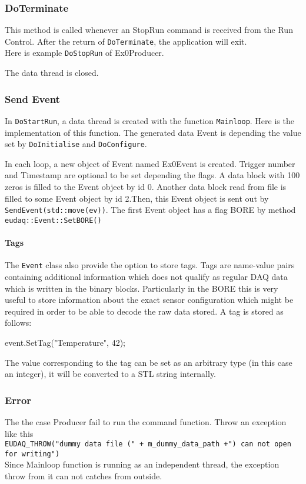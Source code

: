 \subsubsection{DoTerminate}
This method is called whenever an StopRun command is received from the Run Control. After the return of \lstinline[style=cpp]{DoTerminate}, the application will exit.\\
Here is example \lstinline[style=cpp]{DoStopRun} of Ex0Producer.

The data thread is closed. 

\subsubsection{Send Event}
In \lstinline[style=cpp]{DoStartRun}, a data thread is created with the function \lstinline[style=cpp]{Mainloop}. Here is the implementation of this function. The generated data Event is depending the value set by \lstinline[style=cpp]{DoInitialise} and \lstinline[style=cpp]{DoConfigure}.

In each loop, a new object of Event named Ex0Event is created. Trigger number and Timestamp are optional to be set depending the flags. A data block with 100 zeros is filled to the Event object by id 0. Another data block read from file is filled to some Event object by id 2.Then, this Event object is sent out by \lstinline[style=cpp]{SendEvent(std::move(ev))}. The first Event object has a flag BORE by method \lstinline[style=cpp]{eudaq::Event::SetBORE()}

\paragraph{Tags}\label{sec:Tags}
The \texttt{Event} class also provide the option to store tags.
Tags are name-value pairs containing additional information which does not qualify as regular DAQ data which is written in the binary blocks.
Particularly in the \gls{BORE} this is very useful to store information about the exact sensor configuration which might be required in order to be able to decode the raw data stored.
A tag is stored as follows:
\begin{listing}
event.SetTag("Temperature", 42);
\end{listing}

The value corresponding to the tag can be set as an arbitrary type (in this case an integer),
it will be converted to a STL string internally.

\subsubsection{Error}\label{sec:Tags}
The the case Producer fail to run the command function. Throw an exception like this\\
\lstinline[style=cpp]{EUDAQ_THROW("dummy data file (" + m_dummy_data_path +") can not open for writing")}\\
Since Mainloop function is running as an independent thread, the exception throw from it can not catches from outside.

